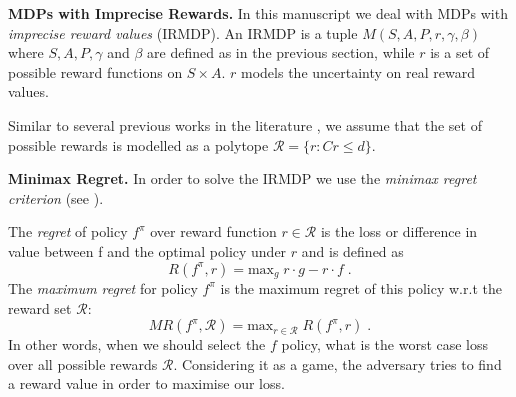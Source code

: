 \documentclass[runningheads,a4paper]{llncs}
\begin{document}
\textbf{MDPs with Imprecise Rewards.}  
In this manuscript we deal with 
MDPs with \textit{imprecise reward values} (IRMDP). An IRMDP \citep{Regan2009} is a tuple $M(S, A, P, r, \gamma, \beta)$ where $S, A, P, \gamma$ and $\beta$ are defined as in the previous section, while $r$ is a set of possible reward functions on $S \times A$. $r$ models the uncertainty on real reward values. 

Similar to several previous works in the literature \cite{Ahmed2017,alizadeh2015,benavent2018,Regan2009,Weng2013}, we assume that the set of possible rewards is modelled as a polytope $\mathcal{R} = \{r: Cr \leq d \}$. %
 

\textbf{Minimax Regret.}  
In order to solve the IRMDP we use the \textit{minimax regret criterion} (see \cite{Regan2009,Xu2009}). 

The \textit{regret} of policy $f^{\pi}$ 
over reward function $r \in \mathcal{R}$ is the loss or difference in value between f and the optimal policy under $r$ and is defined as 
$$R(f^{\pi}, r) = \text{max}_{g} \; r \cdot g - r \cdot f\;.$$
The \textit{maximum regret} for policy $f^{\pi}$ is the maximum regret of this policy w.r.t the reward set 
$\mathcal{R}$: $$MR(f^{\pi}, \mathcal{R}) = \text{max}_{r \in \mathcal{R}}\;R(f^{\pi},r)\;.$$ 
In other words, when we should select the $f$ policy, what is the worst case loss over all possible rewards $\mathcal{R}$. Considering it as a game, the adversary tries to find a reward value in order to maximise our loss.  
\end{document}
